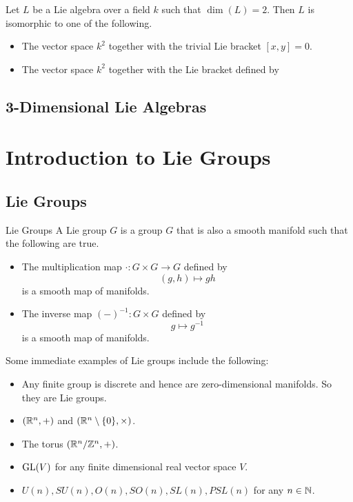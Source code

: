 \documentclass[a4paper]{article}
\begin{document}
\begin{prp}{}{} Let $L$ be a Lie algebra over a field $k$ such that $\dim(L)=2$. Then $L$ is isomorphic to one of the following. 
\begin{itemize}
\item The vector space $k^2$ together with the trivial Lie bracket $[x,y]=0$. 
\item The vector space $k^2$ together with the Lie bracket defined by 
\end{itemize}
\end{prp}

\subsection{3-Dimensional Lie Algebras}

\pagebreak
\pagebreak
\section{Introduction to Lie Groups}
\subsection{Lie Groups}
\begin{defn}{Lie Groups}{} A Lie group $G$ is a group $G$ that is also a smooth manifold such that the following are true. 
\begin{itemize}
\item The multiplication map $\cdot:G\times G\to G$ defined by $$(g,h)\mapsto gh$$ is a smooth map of manifolds. 
\item The inverse map $(-)^{-1}:G\times G$ defined by $$g\mapsto g^{-1}$$ is a smooth map of manifolds. 
\end{itemize}
\end{defn}

Some immediate examples of Lie groups include the following: 
\begin{itemize}
\item Any finite group is discrete and hence are zero-dimensional manifolds. So they are Lie groups. 
\item $(\mathbb{R}^n,+)$ and $(\mathbb{R}^n\setminus\{0\},\times)$. 
\item The torus $(\mathbb{R}^n/\mathbb{Z}^n,+)$. 
\item $\operatorname{GL}(V)$ for any finite dimensional real vector space $V$. 
\item $U(n), SU(n), O(n), SO(n), SL(n), PSL(n)$ for any $n\in\mathbb{N}$. 
\end{itemize}
\end{document}
